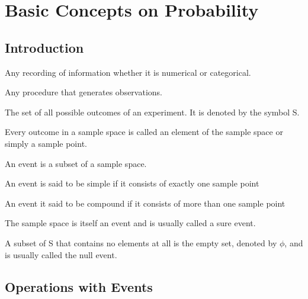 \chapter{Basic Concepts on Probability}
\section{Introduction}
\begin{definition}[Observation]
Any recording of information whether it is numerical or categorical.
\end{definition}
\begin{definition}[Experiment]
Any procedure that generates observations.
\end{definition}

\begin{definition}
The set of all possible outcomes of an experiment. It is denoted by the symbol S.
\end{definition}

\begin{definition}
Every outcome in a sample space is called an element of the sample space or simply a sample point.
\end{definition}

\begin{definition}[Event]
An event is a subset of a sample space.
\end{definition}

\begin{definition}
An event is said to be simple if it consists of exactly one sample point
\end{definition}

\begin{definition}
An event it said to be compound if it consists of more than one sample point
\end{definition}

\begin{note}\end{note}
The sample space is itself an event and is usually called a sure event.


\begin{note}\end{note}
A subset of S that contains no elements at all is the empty set, denoted by $\phi$, and is usually called the null event.


\section{Operations with Events}


